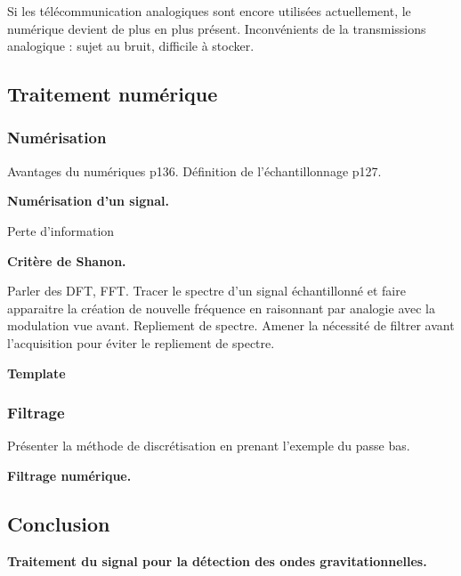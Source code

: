 \begin{transition}
Si les télécommunication analogiques sont encore utilisées actuellement, le numérique devient de plus en plus présent.
Inconvénients de la transmissions analogique : sujet au bruit, difficile à stocker.
\end{transition}

\subsection{Traitement numérique}

\subsubsection{Numérisation}

Avantages du numériques \cite{Cardini2017} p136.
Définition de l'échantillonnage \cite{Cardini2017} p127.

\begin{slide}
\textbf{Numérisation d'un signal.}
\end{slide}

Perte d'information

\begin{slide}
\textbf{Critère de Shanon.}
\end{slide}
Parler des DFT, FFT.
Tracer le spectre d'un signal échantillonné et faire apparaitre la création de nouvelle fréquence en raisonnant par analogie avec la modulation vue avant.
Repliement de spectre.
Amener la nécessité de filtrer avant l'acquisition pour éviter le repliement de spectre.

\begin{transition}
\textbf{Template}
\end{transition}

\subsubsection{Filtrage}

Présenter la méthode de discrétisation en prenant l'exemple du passe bas.

\begin{slide}
\textbf{Filtrage numérique.}
\end{slide}

\subsection*{Conclusion}

\begin{slide}
\textbf{Traitement du signal pour la détection des ondes gravitationnelles.}
\end{slide}

\newpage